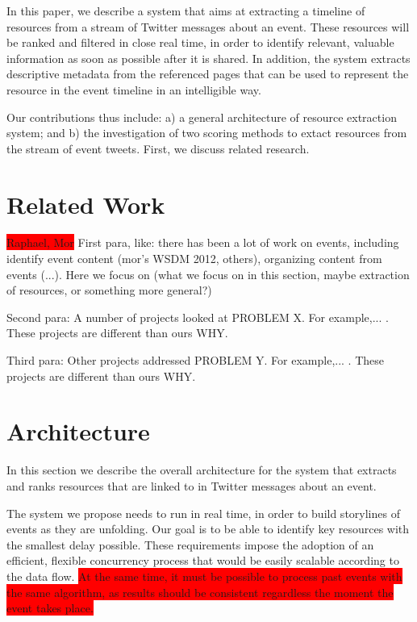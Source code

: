 \documentclass{sig-alternate}
\newcommand{\todo}[1]{\colorbox{red}{#1}}
\begin{document}
In this paper, we describe a system that aims at extracting a timeline of resources from a stream of Twitter messages about an event. These resources will be ranked and filtered in close real time, in order to identify relevant, valuable information as soon as possible after it is shared. In addition, the system extracts descriptive metadata from the referenced pages that can be used to represent the resource in the event timeline in an intelligible way. 

Our contributions thus include: a) a general architecture of resource extraction system; and b) the investigation of two scoring methods to extact resources from the stream of event tweets. First, we discuss related research.


\section{Related Work}
\label{sec:related-work}

\todo{Raphael, Mor}
First para, like: there has been a lot of work on events, including identify event content (mor's WSDM 2012, others), organizing content from events (...). Here we focus on (what we focus on in this section, maybe extraction of resources, or something more general?)

Second para: A number of projects looked at PROBLEM X. For example,... . These projects are different than ours WHY.

Third para: Other projects addressed PROBLEM Y. For example,... . These projects are different than ours WHY.



\section{Architecture}
\label{sec:architecture}
In this section we describe the overall architecture for the system that extracts and ranks resources that are linked to in Twitter messages about an event. 

The system we propose needs to run in real time, in order to build storylines of events as they are unfolding. Our goal is to be able to identify key resources with the smallest delay possible. These requirements impose the adoption of an efficient, flexible concurrency process that would be easily scalable according to the data flow. \todo{At the same time, it must be possible to process past events with the same algorithm, as results should be consistent regardless the moment the event takes place.}
\end{document}
